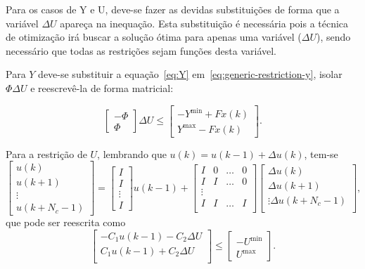 Para os casos de Y e U, deve-se fazer as devidas substituições de forma que a
variável \( \Delta{}U \) apareça na inequação. Esta substituição é necessária
pois a técnica de otimização irá buscar a solução ótima para apenas uma variável
(\( \Delta{}U \)), sendo necessário que todas as restrições sejam funções desta
variável.

Para \( Y \) deve-se substituir a equação~\eqref{eq:Y}
em~\eqref{eq:generic-restriction-y}, isolar \( \Phi{}\Delta{}U \) e reescrevê-la
de forma matricial:

\begin{equation}
	\label{eq:generic-restriction-y-matrix-form}
	\begin{bmatrix}
		-\Phi \\
		\Phi
	\end{bmatrix} \Delta{}U \le
	\begin{bmatrix}
		-Y^{\min} + Fx(k) \\
		Y^{\max} - Fx(k)
	\end{bmatrix}.
\end{equation}

Para a restrição de \( U \), lembrando que \( u(k) = u(k-1) + \Delta{}u(k) \),
tem-se
%
\begin{equation}
	\label{eq:generic-restriction-u-matrix-eq}
	\begin{bmatrix}
		u(k)   \\
		u(k+1) \\
		\vdots \\
		u(k+N_c-1)
	\end{bmatrix} =
	\begin{bmatrix}
		I      \\
		I      \\
		\vdots \\
		I
	\end{bmatrix}
	u(k-1) +
	\begin{bmatrix}
		I & 0 & \hdots & 0 \\
		I & I & \hdots & 0 \\
		\vdots             \\
		I & I & \hdots & I \\
	\end{bmatrix}
	\begin{bmatrix}
		\Delta{}u(k)       \\
		\Delta{}u(k+1)     \\
		\vdots
		\Delta{}u(k+N_c-1) \\
	\end{bmatrix},
\end{equation}
%
que pode ser reescrita como
%
\begin{equation}
	\label{eq:generic-restriction-u-matrix-form}
	\begin{bmatrix}
		-C_1u(k-1) - C_2\Delta{}U \\
		C_1u(k-1) + C_2\Delta{}U  \\
	\end{bmatrix} \le
	\begin{bmatrix}
		-U^{\min} \\
		U^{\max}
	\end{bmatrix}.
\end{equation}


